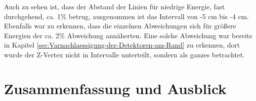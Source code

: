 \documentclass[a4paper,11pt,oneside,final,german,openbib,pdftex]{scrbook}
\begin{document}
Auch zu sehen ist, dass der Abstand der Linien f\"ur niedrige Energie, fast durchgehend, ca. 1\% betrug, ausgenommen ist das Intervall von -5 cm bis -4 cm. Ebenfalls war zu erkennen, dass die einzelnen Abweichungen sich f\"ur gr\"o{\ss}ere Energien der ca. 2\% Abweichung ann\"aherten. Eine solche Abweichung war bereits in Kapitel \ref{sec:Varnachlaessigung-der-Detektoren-am-Rand} zu erkennen, dort wurde der Z-Vertex nicht in Intervalle unterteilt, sondern als ganzes betrachtet.


\chapter{Zusammenfassung und Ausblick}

\end{document}
